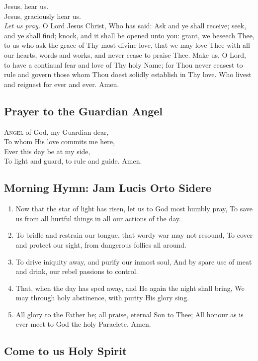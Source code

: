 \documentclass[9pt]{article}
\begin{document}
\begin{multicols}{3}
Jesus, hear us.\\
Jesus, graciously hear us.\\
\textit{Let us pray.} O Lord Jesus Christ, Who has said: Ask and ye shall receive;
seek, and ye shall find; knock, and it shall be opened unto you: grant,
we beseech Thee, to us who ask the grace of Thy most divine love, that we may
love Thee with all our hearts, words and works, and never cease to praise Thee.
Make us, O Lord, to have a continual fear and love of Thy holy Name; for Thou
never ceasest to rule and govern those whom Thou doest solidly establish in Thy
love. Who livest and reignest for ever and ever. Amen.

\subsection*{Prayer to the Guardian Angel}

\textsc{Angel} of God, my Guardian dear,\\
To whom His love commits me here,\\
Ever this day be at my side,\\
To light and guard, to rule and guide.  Amen.

\subsection*{Morning Hymn: Jam Lucis Orto Sidere}

\begin{enumerate}
    \item Now that the star of light has risen, let us to God most humbly pray,
To save us from all hurtful things in all our actions of the day.
    \item To bridle and restrain our tongue, that wordy war may not resound,
To cover and protect our sight,  from dangerous follies all around.
    \item To drive iniquity away, and purify our inmost soul,
And by spare use of meat and drink, our rebel passions to control.
    \item That, when the day has sped away, and He again the night shall bring,
We may through holy abstinence, with purity His glory sing.
    \item All glory to the Father be; all praise, eternal Son to Thee;
All honour as is ever meet to God the holy Paraclete. Amen.
\end{enumerate}

\subsection*{Come to us Holy Spirit}


\end{multicols}
\end{document}
